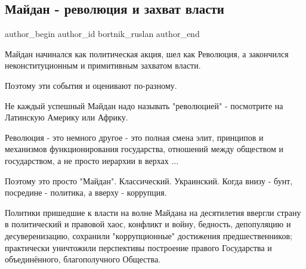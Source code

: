  
 
 
 
 
 
\subsection{Майдан - революция и захват власти}
\label{sec:21_11_2021.fb.bortnik_ruslan.1.maidan_revolucia_zahvat_vlasti}
 
\ifcmt
 author_begin
   author_id bortnik_ruslan
 author_end
\fi

Майдан начинался как политическая акция, шел как Революция, а закончился
неконституционным и примитивным захватом власти. 

Поэтому эти события и оценивают по-разному.  

Не каждый успешный Майдан надо называть "революцией" - посмотрите на Латинскую
Америку или Африку.

Революция - это немного другое - это полная смена элит, принципов и механизмов
функционирования государства, отношений между обществом и государством, а не
просто иерархии в верхах ...

Поэтому это просто "Майдан". Классический. Украинский. Когда внизу - бунт,
посредине  - политика, а вверху - коррупция. 

Политики пришедшие к власти на волне Майдана на десятилетия ввергли страну в
политический  и правовой хаос, конфликт и войну, бедность, депопуляцию и
десуверенизацию, сохранили "коррупционные" достижения предшественников;
практически уничтожили перспективы построение правого Государства и
объединённого, благополучного Общества.
